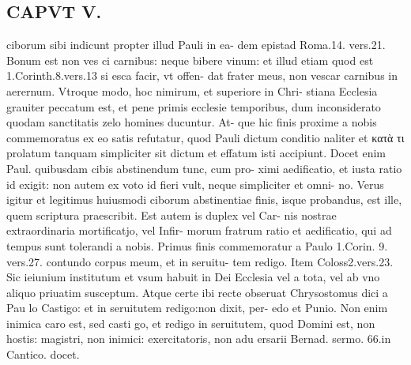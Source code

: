 \documentclass{article}
\begin{document}
\begin{pages}
\section*{CAPVT  V. }
\marginpar{[ p.375 ]}\pstart ciborum sibi indicunt propter illud Pauli in ea- dem epistad Roma.14. vers.21. Bonum est non ves ci carnibus: neque bibere vinum: et illud etiam quod est 1.Corinth.8.vers.13 si esca facir, vt offen- dat frater meus, non vescar carnibus in aerernum. Vtroque modo, hoc nimirum, et superiore in Chri- stiana Ecclesia grauiter peccatum est, et pene primis ecclesie temporibus, dum inconsiderato quodam sanctitatis zelo homines ducuntur. At- que hic finis proxime a nobis commemoratus ex eo satis refutatur, quod Pauli dictum conditio naliter et κατὰ τι prolatum tanquam simpliciter sit dictum et effatum isti accipiunt. Docet enim Paul. quibusdam cibis abstinendum tunc, cum pro- ximi aedificatio, et iusta ratio id exigit: non autem ex voto id fieri vult, neque simpliciter et omni- no. Verus igitur et legitimus huiusmodi ciborum abstinentiae finis, isque probandus, est ille, quem scriptura praescribit. Est autem is duplex vel Car- nis nostrae extraordinaria mortificatjo, vel Infir- morum fratrum ratio et aedificatio, qui ad tempus sunt tolerandi a nobis. Primus finis commemoratur a Paulo 1.Corin. 9. vers.27. contundo corpus meum, et in seruitu- tem redigo. Item Coloss2.vers.23. Sic ieiunium institutum et vsum habuit in Dei Ecclesia vel a tota, vel ab vno aliquo priuatim susceptum. Atque certe ibi recte obseruat Chrysostomus dici a Pau lo Castigo: et in seruitutem redigo:non dixit, per- edo et Punio. Non enim inimica caro est, sed casti go, et redigo in seruitutem, quod Domini est, non hostis: magistri, non inimici: exercitatoris, non adu ersarii Bernad. sermo. 66.in Cantico. docet.  \pend

\end{pages}
\end{document}
